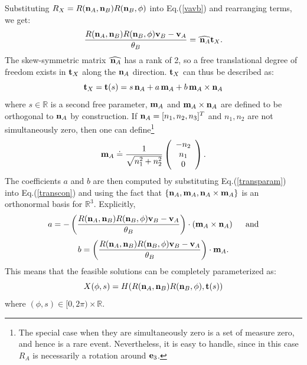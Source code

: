 \documentclass[twocolumn,10pt]{asme2ej}
\newcommand{\IR}{\mathbb{R}}
\begin{document}
Substituting $R_X = R({\bf n}_A, {\bf n}_B) R({\bf n}_B, \phi)$ into Eq.(\ref{vavb}) and rearranging terms, we get:
\begin{equation}
\frac{R({\bf n}_A, {\bf n}_B) R({\bf n}_B, \phi) {\bf v}_B - {\bf v}_A}{\theta_B} = \widehat{\, {\bf n}_A} {\bf t}_X.
\label{transcon} \end{equation}
The skew-symmetric matrix $\widehat{\, {\bf n}_A}$ has a rank of 2, so a free translational degree of freedom exists in ${\bf t}_X$ along the ${\bf n}_A$ direction. ${\bf t}_X$ can thus be described as:
\begin{equation}
{\bf t}_X =  {\bf t}(s) = s \, {\bf n}_A + a \, {\bf m}_A + b \, {\bf m}_A \times {\bf n}_A
\label{transparam} \end{equation}
where $s \in \mathbb{R}$ is a second free parameter, ${\bf m}_A$ and ${\bf m}_A \times {\bf n}_A$ are
defined to be orthogonal to ${\bf n}_A$ by construction. If
${\bf n}_A  = [n_1, n_2, n_3]^T$ and $n_1, n_2$ are not simultaneously zero, then one can define\footnote{The special case when they are simultaneously zero
is a set of measure zero, and hence is a rare event. Nevertheless, it is easy to handle, since in this case $R_A$ is necessarily a rotation around ${\bf e}_3$.}
$$ {\bf m}_A \doteq \frac{1}{\sqrt{n_1^2 + n_2^2}} \left(\begin{array}{c}
-n_2 \\
n_1 \\
0 \end{array}\right).
$$
The coefficients $a$ and $b$ are then computed by substituting Eq.(\ref{transparam}) into Eq.(\ref{transcon}) and using the fact that
$\{{\bf n}_A, {\bf m}_A, {\bf n}_A \times {\bf m}_A\}$ is an orthonormal basis for $\mathbb{R}^3$. Explicitly,
$$ a = - \left(\frac{R({\bf n}_A, {\bf n}_B) R({\bf n}_B, \phi) {\bf v}_B - {\bf v}_A}{\theta_B}\right) \cdot \left({\bf m}_A \times {\bf n}_A\right) \hspace{5mm}\mbox{and}$$
$$ b =\left(\frac{R({\bf n}_A, {\bf n}_B) R({\bf n}_B, \phi) {\bf v}_B - {\bf v}_A}{\theta_B}\right)\cdot {\bf m}_A . $$
This means that the feasible solutions can be completely parameterized as:
\begin{equation}
X(\phi,s) = H(R({\bf n}_A, {\bf n}_B) R({\bf n}_B, \phi), {\bf t}(s))
\label{cylinder} \end{equation}
where $(\phi, s) \in [0,2\pi) \times \IR$.
\end{document}
